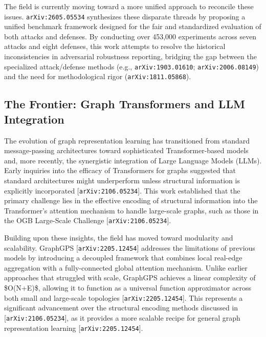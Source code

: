 \documentclass[11pt]{article}
\begin{document}
The field is currently moving toward a more unified approach to reconcile these issues. \texttt{arXiv:2605.05534} synthesizes these disparate threads by proposing a unified benchmark framework designed for the fair and standardized evaluation of both attacks and defenses. By conducting over 453,000 experiments across seven attacks and eight defenses, this work attempts to resolve the historical inconsistencies in adversarial robustness reporting, bridging the gap between the specialized attack/defense methods (e.g., \texttt{arXiv:1903.01610}; \texttt{arXiv:2006.08149}) and the need for methodological rigor (\texttt{arXiv:1811.05868}).

\subsection{The Frontier: Graph Transformers and LLM Integration}

The evolution of graph representation learning has transitioned from standard message-passing architectures toward sophisticated Transformer-based models and, more recently, the synergistic integration of Large Language Models (LLMs). Early inquiries into the efficacy of Transformers for graphs suggested that standard architectures might underperform unless structural information is explicitly incorporated [\texttt{arXiv:2106.05234}]. This work established that the primary challenge lies in the effective encoding of structural information into the Transformer's attention mechanism to handle large-scale graphs, such as those in the OGB Large-Scale Challenge [\texttt{arXiv:2106.05234}].

Building upon these insights, the field has moved toward modularity and scalability. GraphGPS [\texttt{arXiv:2205.12454}] addresses the limitations of previous models by introducing a decoupled framework that combines local real-edge aggregation with a fully-connected global attention mechanism. Unlike earlier approaches that struggled with scale, GraphGPS achieves a linear complexity of \$O(N+E)\$, allowing it to function as a universal function approximator across both small and large-scale topologies [\texttt{arXiv:2205.12454}]. This represents a significant advancement over the structural encoding methods discussed in [\texttt{arXiv:2106.05234}], as it provides a more scalable recipe for general graph representation learning [\texttt{arXiv:2205.12454}].
\end{document}
